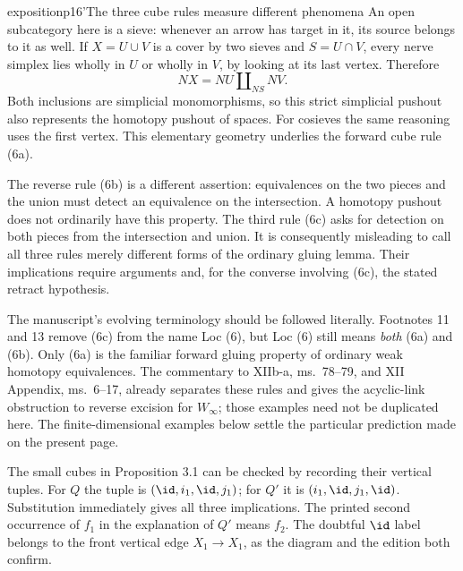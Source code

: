 \begin{dcomment}{exposition}{p16'}{The three cube rules measure different phenomena}
An open subcategory here is a sieve: whenever an arrow has target in it, its source belongs to it as well. If $X=U\cup V$ is a cover by two sieves and $S=U\cap V$, every nerve simplex lies wholly in $U$ or wholly in $V$, by looking at its last vertex. Therefore
\[
NX=NU\amalg_{NS}NV.
\]
Both inclusions are simplicial monomorphisms, so this strict simplicial pushout also represents the homotopy pushout of spaces. For cosieves the same reasoning uses the first vertex. This elementary geometry underlies the forward cube rule (6a).

The reverse rule (6b) is a different assertion: equivalences on the two pieces and the union must detect an equivalence on the intersection. A homotopy pushout does not ordinarily have this property. The third rule (6c) asks for detection on both pieces from the intersection and union. It is consequently misleading to call all three rules merely different forms of the ordinary gluing lemma. Their implications require arguments and, for the converse involving (6c), the stated retract hypothesis.

The manuscript's evolving terminology should be followed literally. Footnotes 11 and 13 remove (6c) from the name Loc (6), but Loc (6) still means \emph{both} (6a) and (6b). Only (6a) is the familiar forward gluing property of ordinary weak homotopy equivalences. The commentary to XIIb-a, ms.~78--79, and XII Appendix, ms.~6--17, already separates these rules and gives the acyclic-link obstruction to reverse excision for $W_\infty$; those examples need not be duplicated here. The finite-dimensional examples below settle the particular prediction made on the present page.

The small cubes in Proposition 3.1 can be checked by recording their vertical tuples. For $Q$ the tuple is $(\id,i_1,\id,j_1)$; for $Q'$ it is $(i_1,\id,j_1,\id)$. Substitution immediately gives all three implications. The printed second occurrence of $f_1$ in the explanation of $Q'$ means $f_2$. The doubtful $\id$ label belongs to the front vertical edge $X_1\to X_1$, as the diagram and the edition both confirm.
\end{dcomment}

